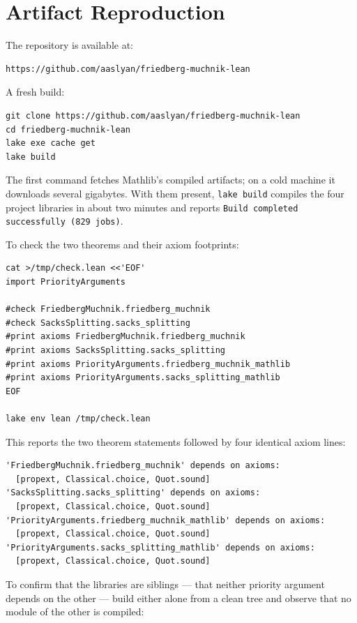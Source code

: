 \section{Artifact Reproduction}
\label{app:artifact}

The repository is available at:

\begin{verbatim}
https://github.com/aaslyan/friedberg-muchnik-lean
\end{verbatim}

A fresh build:

\begin{verbatim}
git clone https://github.com/aaslyan/friedberg-muchnik-lean
cd friedberg-muchnik-lean
lake exe cache get
lake build
\end{verbatim}

The first command fetches Mathlib's compiled artifacts; on a cold machine
it downloads several gigabytes.  With them present, \texttt{lake build}
compiles the four project libraries in about two minutes and reports
\texttt{Build completed successfully (829 jobs)}.

To check the two theorems and their axiom footprints:

\begin{verbatim}
cat >/tmp/check.lean <<'EOF'
import PriorityArguments

#check FriedbergMuchnik.friedberg_muchnik
#check SacksSplitting.sacks_splitting
#print axioms FriedbergMuchnik.friedberg_muchnik
#print axioms SacksSplitting.sacks_splitting
#print axioms PriorityArguments.friedberg_muchnik_mathlib
#print axioms PriorityArguments.sacks_splitting_mathlib
EOF

lake env lean /tmp/check.lean
\end{verbatim}

This reports the two theorem statements followed by four identical axiom
lines:

\begin{verbatim}
'FriedbergMuchnik.friedberg_muchnik' depends on axioms:
  [propext, Classical.choice, Quot.sound]
'SacksSplitting.sacks_splitting' depends on axioms:
  [propext, Classical.choice, Quot.sound]
'PriorityArguments.friedberg_muchnik_mathlib' depends on axioms:
  [propext, Classical.choice, Quot.sound]
'PriorityArguments.sacks_splitting_mathlib' depends on axioms:
  [propext, Classical.choice, Quot.sound]
\end{verbatim}

To confirm that the libraries are siblings --- that neither priority
argument depends on the other --- build either alone from a clean tree and
observe that no module of the other is compiled:

